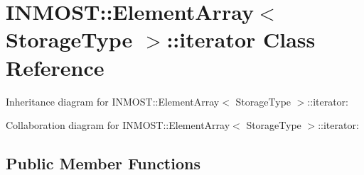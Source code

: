 \hypertarget{classINMOST_1_1ElementArray_1_1iterator}{\section{I\-N\-M\-O\-S\-T\-:\-:Element\-Array$<$ Storage\-Type $>$\-:\-:iterator Class Reference}
\label{classINMOST_1_1ElementArray_1_1iterator}
}


Inheritance diagram for I\-N\-M\-O\-S\-T\-:\-:Element\-Array$<$ Storage\-Type $>$\-:\-:iterator\-:


Collaboration diagram for I\-N\-M\-O\-S\-T\-:\-:Element\-Array$<$ Storage\-Type $>$\-:\-:iterator\-:
\subsection*{Public Member Functions}
